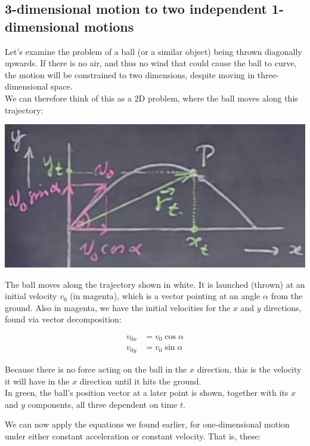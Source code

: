 \documentclass[8.01x]{subfiles}
\begin{document}
\newpage

\subsection{3-dimensional motion to two independent 1-dimensional motions}

Let's examine the problem of a ball (or a similar object) being thrown diagonally upwards. If there is no air, and thus no wind that could cause the ball to curve, the motion will be constrained to two dimensions, despite moving in three-dimensional space.\\
We can therefore think of this as a 2D problem, where the ball moves along this trajectory:

\begin{center}
\includegraphics[scale=0.65]{Graphics/2d-motion-decomposed}
\end{center}

The ball moves along the trajectory shown in white. It is launched (thrown) at an initial velocity $v_0$ (in magenta), which is a vector pointing at an angle $\alpha$ from the ground. Also in magenta, we have the initial velocities for the $x$ and $y$ directions, found via vector decomposition:

\begin{align}
v_{0x} &= v_0 \cos \alpha\\
v_{0y} &= v_0 \sin \alpha
\end{align}

Because there is no force acting on the ball in the $x$ direction, this is the velocity it will have in the $x$ direction until it hits the ground.\\
In green, the ball's position vector at a later point is shown, together with its $x$ and $y$ components, all three dependent on time $t$.

We can now apply the equations we found earlier, for one-dimensional motion under either constant acceleration or constant velocity. That is, these:
\end{document}

